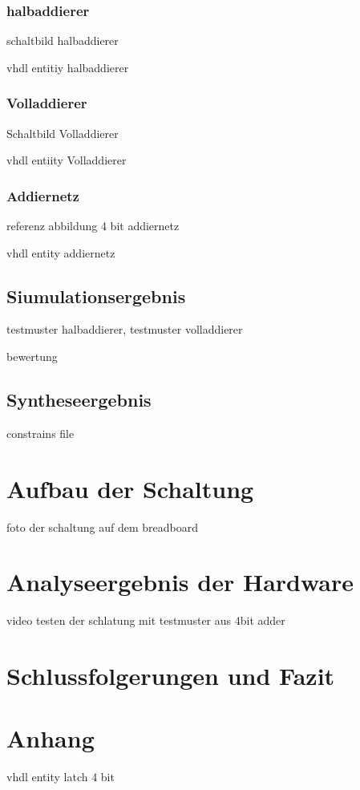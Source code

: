\documentclass[
    paper=a4,
    parskip=half,
]{scrreprt}
\begin{document}
        \subsection{halbaddierer}
            schaltbild halbaddierer

            vhdl entitiy halbaddierer

        \subsection{Volladdierer}
            Schaltbild Volladdierer

            vhdl entiity Volladdierer

        \subsection{Addiernetz}
            referenz abbildung 4 bit addiernetz

            vhdl entity addiernetz

    \section{Siumulationsergebnis}
        testmuster halbaddierer, testmuster volladdierer

        bewertung

    \section{Syntheseergebnis}
        constrains file

\chapter{Aufbau der Schaltung}
    foto der schaltung auf dem breadboard

\chapter{Analyseergebnis der Hardware}
    video testen der schlatung mit testmuster aus 4bit adder

\chapter{Schlussfolgerungen und Fazit}

\chapter{Anhang}
    vhdl entity latch 4 bit
\end{document}
